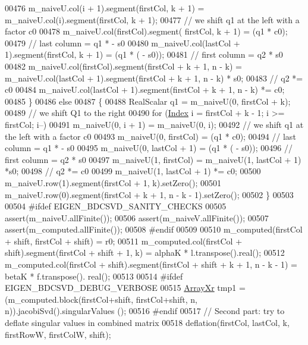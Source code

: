 \begin{DoxyCode}
00476       m\_naiveU.col(i + 1).segment(firstCol, k + 1) = m\_naiveU.col(i).segment(firstCol, k + 1);
00477     \textcolor{comment}{// we shift q1 at the left with a factor c0}
00478     m\_naiveU.col(firstCol).segment( firstCol, k + 1) = (q1 * c0);
00479     \textcolor{comment}{// last column = q1 * - s0}
00480     m\_naiveU.col(lastCol + 1).segment(firstCol, k + 1) = (q1 * ( - s0));
00481     \textcolor{comment}{// first column = q2 * s0}
00482     m\_naiveU.col(firstCol).segment(firstCol + k + 1, n - k) = m\_naiveU.col(lastCol + 1).segment(firstCol + 
      k + 1, n - k) * s0; 
00483     \textcolor{comment}{// q2 *= c0}
00484     m\_naiveU.col(lastCol + 1).segment(firstCol + k + 1, n - k) *= c0;
00485   \} 
00486   \textcolor{keywordflow}{else} 
00487   \{
00488     RealScalar q1 = m\_naiveU(0, firstCol + k);
00489     \textcolor{comment}{// we shift Q1 to the right}
00490     \textcolor{keywordflow}{for} (\hyperlink{namespace_eigen_a62e77e0933482dafde8fe197d9a2cfde}{Index} i = firstCol + k - 1; i >= firstCol; i--) 
00491       m\_naiveU(0, i + 1) = m\_naiveU(0, i);
00492     \textcolor{comment}{// we shift q1 at the left with a factor c0}
00493     m\_naiveU(0, firstCol) = (q1 * c0);
00494     \textcolor{comment}{// last column = q1 * - s0}
00495     m\_naiveU(0, lastCol + 1) = (q1 * ( - s0));
00496     \textcolor{comment}{// first column = q2 * s0}
00497     m\_naiveU(1, firstCol) = m\_naiveU(1, lastCol + 1) *s0; 
00498     \textcolor{comment}{// q2 *= c0}
00499     m\_naiveU(1, lastCol + 1) *= c0;
00500     m\_naiveU.row(1).segment(firstCol + 1, k).setZero();
00501     m\_naiveU.row(0).segment(firstCol + k + 1, n - k - 1).setZero();
00502   \}
00503   
00504 \textcolor{preprocessor}{#ifdef EIGEN\_BDCSVD\_SANITY\_CHECKS}
00505   assert(m\_naiveU.allFinite());
00506   assert(m\_naiveV.allFinite());
00507   assert(m\_computed.allFinite());
00508 \textcolor{preprocessor}{#endif}
00509   
00510   m\_computed(firstCol + shift, firstCol + shift) = r0;
00511   m\_computed.col(firstCol + shift).segment(firstCol + shift + 1, k) = alphaK * l.transpose().real();
00512   m\_computed.col(firstCol + shift).segment(firstCol + shift + k + 1, n - k - 1) = betaK * f.transpose().
      real();
00513 
00514 \textcolor{preprocessor}{#ifdef EIGEN\_BDCSVD\_DEBUG\_VERBOSE}
00515   \hyperlink{group___core___module}{ArrayXr} tmp1 = (m\_computed.block(firstCol+shift, firstCol+shift, n, n)).jacobiSvd().singularValues
      ();
00516 \textcolor{preprocessor}{#endif}
00517   \textcolor{comment}{// Second part: try to deflate singular values in combined matrix}
00518   deflation(firstCol, lastCol, k, firstRowW, firstColW, shift);

\end{DoxyCode}
